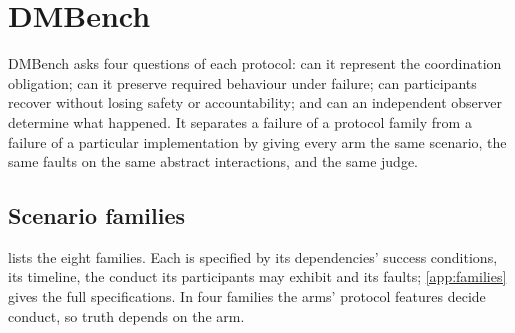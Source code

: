 \section{DMBench}
\label{sec:dmbench}

DMBench asks four questions of each protocol: can it represent the coordination obligation; can it preserve required behaviour under failure; can participants recover without losing safety or accountability; and can an independent observer determine what happened. It separates a failure of a protocol family from a failure of a particular implementation by giving every arm the same scenario, the same faults on the same abstract interactions, and the same judge.

\subsection{Scenario families}

 lists the eight families. Each is specified by its dependencies' success conditions, its timeline, the conduct its participants may exhibit and its faults; \cref{app:families} gives the full specifications. In four families the arms' protocol features decide conduct, so truth depends on the arm.

